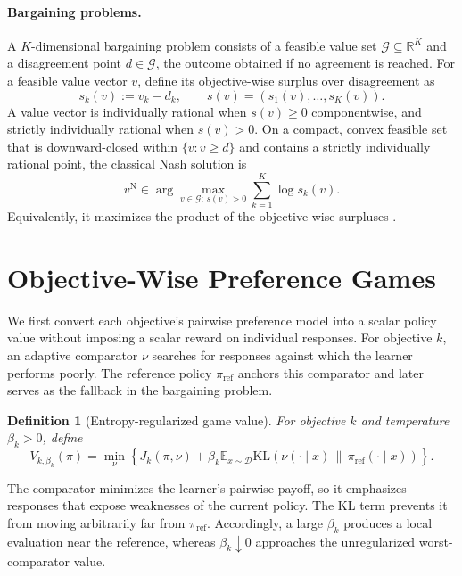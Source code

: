 \documentclass{article}
\newtheorem{definition}{Definition}
\theoremstyle{remark}
\theoremstyle{plain}
\newcommand{\G}{\mathcal{G}}
\newcommand{\KL}{\mathrm{KL}}
\newcommand{\E}{\mathbb{E}}
\newcommand{\R}{\mathbb{R}}
\newcommand{\D}{\mathcal{D}}
\newcommand{\piref}{\pi_{\mathrm{ref}}}
\begin{document}
\paragraph{Bargaining problems.}
A $K$-dimensional bargaining problem consists of a feasible value set $\G\subseteq\R^K$ and a disagreement point $d\in\G$, the outcome obtained if no agreement is reached. For a feasible value vector $v$, define its objective-wise surplus over disagreement as
\begin{equation}
s_k(v):=v_k-d_k,
\qquad
s(v)=(s_1(v),\ldots,s_K(v)).
\label{eq:classical-surplus}
\end{equation}
A value vector is individually rational when $s(v)\ge0$ componentwise, and strictly individually rational when $s(v)>0$. On a compact, convex feasible set that is downward-closed within $\{v:v\ge d\}$ and contains a strictly individually rational point, the classical Nash solution is
\begin{equation}
v^{\mathrm N}
\in
\arg\max_{v\in\G:\,s(v)>0}
\sum_{k=1}^K\log s_k(v).
\label{eq:classical-nash}
\end{equation}
Equivalently, it maximizes the product of the objective-wise surpluses \citep{nash1950}.

\section{Objective-Wise Preference Games}
\label{sec:game-utility}
We first convert each objective's pairwise preference model into a scalar policy value without imposing a scalar reward on individual responses. For objective $k$, an adaptive comparator $\nu$ searches for responses against which the learner performs poorly. The reference policy $\piref$ anchors this comparator and later serves as the fallback in the bargaining problem.

\begin{definition}[Entropy-regularized game value]
\label{def:game-value}
For objective $k$ and temperature $\beta_k>0$, define
\begin{equation}
V_{k,\beta_k}(\pi)
=
\min_{\nu}
\left\{
J_k(\pi,\nu)
+
\beta_k\E_{x\sim\D}
\KL\!\left(\nu(\cdot\mid x)\,\|\,\piref(\cdot\mid x)\right)
\right\}.
\label{eq:game-value}
\end{equation}
\end{definition}
The comparator minimizes the learner's pairwise payoff, so it emphasizes responses that expose weaknesses of the current policy. The KL term prevents it from moving arbitrarily far from $\piref$. Accordingly, a large $\beta_k$ produces a local evaluation near the reference, whereas $\beta_k\downarrow0$ approaches the unregularized worst-comparator value.
\end{document}

